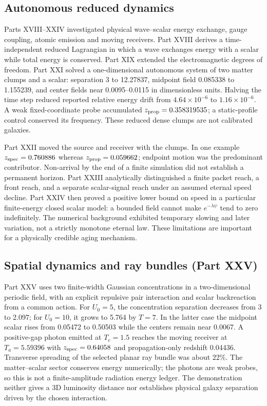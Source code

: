 \documentclass[
  11pt,
  twoside]{article}
\begin{document}
\subsection{Autonomous reduced
dynamics}\label{autonomous-reduced-dynamics}

Parts XVIII--XXIV investigated physical wave--scalar energy exchange,
gauge coupling, atomic emission and moving receivers. Part XVIII derives
a time-independent reduced Lagrangian in which a wave exchanges energy
with a scalar while total energy is conserved. Part XIX extended the
electromagnetic degrees of freedom. Part XXI solved a one-dimensional
autonomous system of two matter clumps and a scalar: separation 3 to
12.27837, midpoint field 0.085338 to 1.155239, and center fields near
0.0095--0.0115 in dimensionless units. Halving the time step reduced
reported relative energy drift from \(4.64\times10^{-6}\) to
\(1.16\times10^{-6}\). A weak fixed-coordinate probe accumulated
\(z_{\rm prop}=0.358319535\); a static-profile control conserved its
frequency. These reduced dense clumps are not calibrated galaxies.

Part XXII moved the source and receiver with the clumps. In one example
\(z_{\rm spec}=0.760886\) whereas \(z_{\rm prop}=0.059662\); endpoint
motion was the predominant contributor. Non-arrival by the end of a
finite simulation did not establish a permanent horizon. Part XXIII
analytically distinguished a finite packet reach, a front reach, and a
separate scalar-signal reach under an assumed eternal speed decline.
Part XXIV then proved a positive lower bound on speed in a particular
finite-energy closed scalar model: a bounded field cannot make
\(e^{-\lambda\psi}\) tend to zero indefinitely. The numerical background
exhibited temporary slowing and later variation, not a strictly monotone
eternal law. These limitations are important for a physically credible
aging mechanism.

\subsection{Spatial dynamics and ray bundles (Part
XXV)}\label{spatial-dynamics-and-ray-bundles-part-xxv}

Part XXV uses two finite-width Gaussian concentrations in a
two-dimensional periodic field, with an explicit repulsive pair
interaction and scalar backreaction from a common action. For \(U_0=5\),
the concentration separation decreases from 3 to 2.097; for \(U_0=10\),
it grows to 5.764 by \(T=7\). In the latter case the midpoint scalar
rises from 0.05472 to 0.50503 while the centers remain near 0.0067. A
positive-gap photon emitted at \(T_e=1.5\) reaches the moving receiver
at \(T_a=5.59396\) with \(z_{\rm spec}=0.64058\) and propagation-only
redshift 0.04436. Transverse spreading of the selected planar ray bundle
was about 22\%. The matter--scalar sector conserves energy numerically;
the photons are weak probes, so this is not a finite-amplitude radiation
energy ledger. The demonstration neither gives a 3D luminosity distance
nor establishes physical galaxy separation driven by the chosen
interaction.
\end{document}
